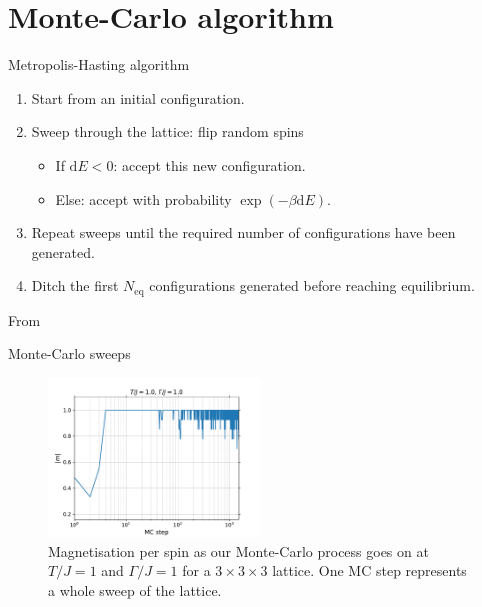 \documentclass[aspectratio=169, xcolor=dvipsnames]{beamer}
\begin{document}
\section{Monte-Carlo algorithm}

\begin{frame}{Metropolis-Hasting algorithm}
		
	\begin{enumerate}
		\itemsep 5mm 
		
		\item Start from an initial configuration.
		
			
		\item Sweep through the lattice: flip random spins
		
		\vspace{5mm}
		
		\begin{itemize}
			\itemsep 3mm 
			
			\item If $\mathrm{d}E<0$: accept this new configuration.
				
			\item Else: accept with probability $\exp\left(-\beta \mathrm{d}E\right)$.
		\end{itemize}
			
		\item Repeat sweeps until the required number of configurations have been generated.
		
		\item Ditch the first $N_\mathrm{eq}$ configurations generated before reaching equilibrium.
			
	\end{enumerate}

	\vfill
	
	From \cite{Binder}
		
\end{frame}


\begin{frame}{Monte-Carlo sweeps}
	
	\begin{figure}
		\centering
		\includegraphics[width=0.5\textwidth]{Plots/MC.pdf}
		\caption{Magnetisation per spin as our Monte-Carlo process goes on at $T/J=1$ and $\Gamma/J=1$ for a $3\times3\times3$ lattice. One MC step represents a whole sweep of the lattice.}
		\label{fig:MC}
	\end{figure}
	
\end{frame}
\end{document}
